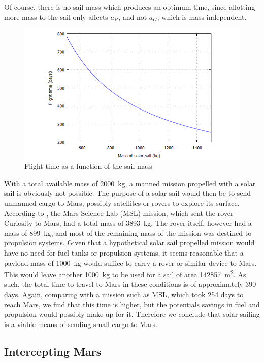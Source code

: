 \documentclass[twocolumn,12pt,a4paper]{article}
\numberwithin{equation}{section}
\begin{document}
Of course, there is no sail mass which produces an optimum time, since allotting more mass to the sail only affects \( a_R \), and not \( a_G \), which is mass-independent. 

\begin{figure}[b]
	\centering
	\includegraphics[scale=0.35]{time}
	\caption{Flight time as a function of the sail mass}
	\label{fig:time of flight}
\end{figure}

With a total available mass of \SI{2000}{kg}, a manned mission propelled with a solar sail is obviously not possible. The purpose of a solar sail would then be to send unmanned cargo to Mars, possibly satellites or rovers to explore its surface. According to \cite{presskit}, the Mars Science Lab (MSL) mission, which sent the rover Curiosity to Mars, had a total mass of \SI{3893}{kg}. The rover itself, however had a mass of \SI{899}{kg}, and most of the remaining mass of the mission was destined to propulsion systems. Given that a hypothetical solar sail propelled mission would have no need for fuel tanks or propulsion systems, it seems reasonable that a payload mass of \SI{1000}{kg} would suffice to carry a rover or similar device to Mars. This would leave another \SI{1000}{kg} to be used for a sail of area \SI{142857}{m^2}. As such, the total time to travel to Mars in these conditions is of approximately 390 days. Again, comparing with a mission such as MSL, which took 254 days to reach Mars, we find that this time is higher, but the potentials savings in fuel and propulsion would possibly make up for it. Therefore we conclude that solar sailing is a viable means of sending small cargo to Mars. 

\subsection{Intercepting Mars}
\end{document}
